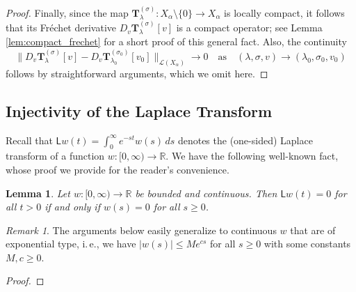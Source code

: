 \documentclass[reqno,10pt,a4paper]{amsart}
\newtheorem{lem}{Lemma}[section]
\theoremstyle{definition}
\theoremstyle{definition}
\theoremstyle{remark}
\theoremstyle{remark}
\newtheorem*{remark*}{Remark}
\numberwithin{equation}{section}
\newcommand{\R}{\mathbb{R}}
\newcommand{\Ts}{\mathbf{T}}
\newcommand{\Tss}{\mathbf{T}^{(\sigma)}_\lambda}
\begin{document}
\begin{appendix}
\begin{proof}
Finally, since the map $\Tss : X_\alpha \setminus \{ 0 \} \to X_\alpha$ is locally compact, it follows that its Fr\'echet derivative $D_v \Tss[v]$ is a compact operator; see Lemma \ref{lem:compact_frechet} for a short proof of this general fact. Also, the continuity 
$$
\| D_v \Tss[v] - D_v \Ts_{\lambda_0}^{(\sigma_0)}[v_0] \|_{\mathcal{L}(X_\alpha)} \to 0 \quad \mbox{as} \quad (\lambda, \sigma, v) \to (\lambda_0, \sigma_0, v_0)
$$
follows by straightforward arguments, which we omit here.
\end{proof}

\subsection{Injectivity of the Laplace Transform}

Recall that $\mathsf{L}w(t) = \int_0^\infty e^{-st} w(s) \,ds$ denotes the (one-sided) Laplace transform of a function $w : [0,\infty) \to \R$. We have the following well-known fact, whose proof we provide for the reader's convenience.
 
\begin{lem} \label{lem:Laplace}
Let $w : [0,\infty) \to \R$ be bounded and continuous. Then $\mathsf{L}w(t) = 0$ for all $t > 0$ if and only if $w(s) = 0$ for all $s \geq 0$.
\end{lem}

\begin{remark*}
The arguments below easily generalize to continuous $w$ that are of exponential type, i.\,e., we have $|w(s)| \leq M e^{c s}$ for all $s \geq 0$ with some constants $M, c \geq 0$.
\end{remark*}

\begin{proof}


\end{proof}
\end{appendix}
\end{document}

